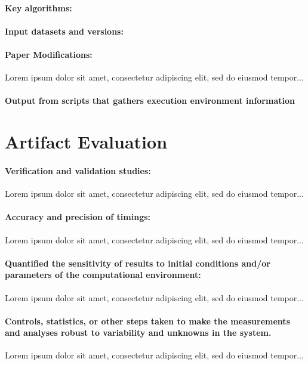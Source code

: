\documentclass[sigconf,nonacm=true]{acmart}
\begin{document}
\paragraph{Key algorithms:} 
\paragraph{Input datasets and versions:} 
\paragraph{Paper Modifications:}
Lorem ipsum dolor sit amet, consectetur adipiscing elit, sed do eiusmod tempor...
\paragraph{Output from scripts that gathers execution environment information}

\section*{Artifact Evaluation}

\paragraph{Verification and validation studies:}
Lorem ipsum dolor sit amet, consectetur adipiscing elit, sed do eiusmod tempor...

\paragraph{Accuracy and precision of timings:} 
Lorem ipsum dolor sit amet, consectetur adipiscing elit, sed do eiusmod tempor...

\paragraph{Quantified the sensitivity of results to initial conditions and/or parameters of the computational environment:} 
Lorem ipsum dolor sit amet, consectetur adipiscing elit, sed do eiusmod tempor...

\paragraph{Controls, statistics, or other steps taken to make the measurements and analyses robust to variability and unknowns in the system.} 
Lorem ipsum dolor sit amet, consectetur adipiscing elit, sed do eiusmod tempor...
\end{document}
